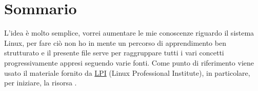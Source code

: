 \chapter*{Sommario}

L'idea è molto semplice, vorrei aumentare le mie conoscenze riguardo il sistema Linux, per fare ciò non ho in mente un percorso di apprendimento ben strutturato e il presente file serve per raggruppare tutti i vari concetti progressivamente appresi seguendo varie fonti. Come punto di riferimento viene usato il materiale fornito da \href{https://learning.lpi.org/it/}{LPI} (Linux Professional Institute), in particolare, per iniziare, la risorsa . 


